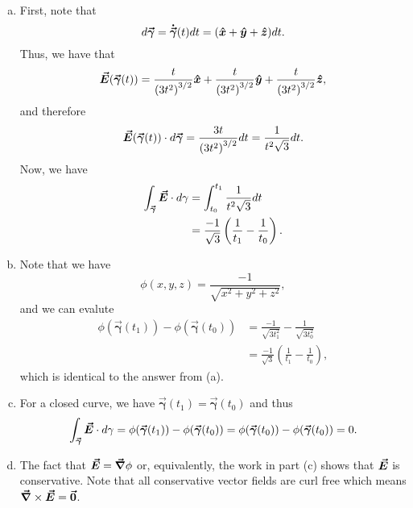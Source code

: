 \documentclass[12pt]{article} %
\newcommand{\curvegamma}{\boldsymbol{\vec{\gamma}}}
\newcommand{\tangentgamma}{\boldsymbol{\dot{\vec{\gamma}}}}
\begin{document}
\begin{solution}~
\begin{enumerate}[(a)]
    \item First, note that
    \[
    d\curvegamma = \tangentgamma(t) dt = (\xhat + \yhat + \zhat)dt.
    \]
    Thus, we have that
    \[
    \vecfieldE(\curvegamma(t))= \frac{t}{\left(3t^2\right)^{3/2}} \xhat + \frac{t}{\left(3t^2\right)^{3/2}} \yhat + \frac{t}{\left(3t^2\right)^{3/2}} \zhat,
    \]
    and therefore
    \[
    \vecfieldE(\curvegamma(t)) \cdot d\curvegamma = \frac{3t}{\left(3t^2\right)^{3/2}}dt = \frac{1}{t^2\sqrt{3}}dt.
    \]
    Now, we have
    \begin{align*}
        \int_{\curvegamma} \vecfieldE \cdot d\gamma &= \int_{t_0}^{t_1} \frac{1}{t^2\sqrt{3}}dt\\
        &= \frac{-1}{\sqrt{3}}\left(\frac{1}{t_1} - \frac{1}{t_0}\right).
    \end{align*}
    \item Note that we have
    \[
    \phi(x,y,z) = \frac{-1}{\sqrt{x^2+y^2+z^2}},
    \]
    and we can evalute 
    \begin{align*}
        \phi(\curvegamma(t_1))-\phi(\curvegamma(t_0)) &= \frac{-1}{\sqrt{3t_1^2}}-\frac{1}{\sqrt{3t_0^2}}\\
        &= \frac{-1}{\sqrt{3}} \left(\frac{1}{t_1}-\frac{1}{t_0}\right),
    \end{align*}
    which is identical to the answer from (a).
    \item For a closed curve, we have $\curvegamma(t_1)=\curvegamma(t_0)$ and thus
    \[
    \int_{\curvegamma} \vecfieldE \cdot d\gamma = \phi(\curvegamma(t_1))-\phi(\curvegamma(t_0)) = \phi(\curvegamma(t_0))-\phi(\curvegamma(t_0))=0.
    \]
    \item The fact that $\boldsymbol{\vec{E}} = \boldsymbol{\vec{\nabla}} \phi$ or, equivalently, the work in part (c) shows that $\boldsymbol{\vec{E}}$ is conservative. Note that all conservative vector fields are curl free which means $\boldsymbol{\vec{\nabla}} \times \boldsymbol{\vec{E}} = \boldsymbol{\vec{0}}$.
\end{enumerate}
\end{solution}
\end{document}
